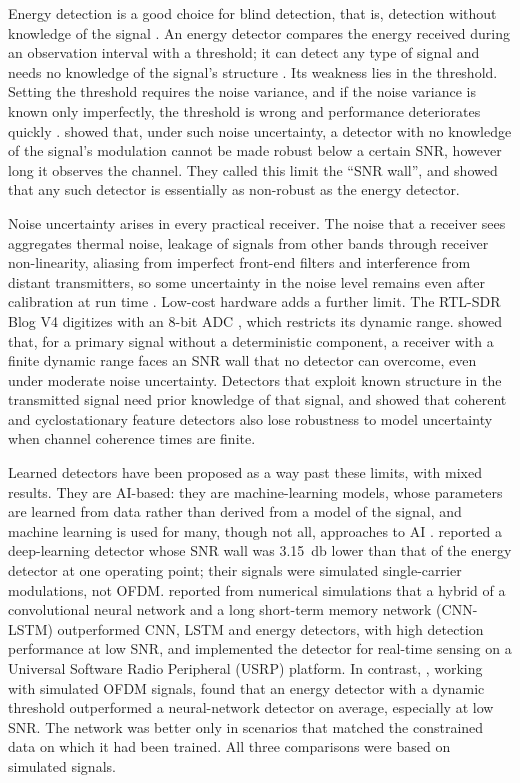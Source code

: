 Energy detection is a good choice for blind detection, that is, detection without knowledge of the signal \parencite{gao2019}. An energy detector compares the energy received during an observation interval with a threshold; it can detect any type of signal and needs no knowledge of the signal's structure \parencite{axell2010}. Its weakness lies in the threshold. Setting the threshold requires the noise variance, and if the noise variance is known only imperfectly, the threshold is wrong and performance deteriorates quickly \parencite{axell2010}. \Textcite{tandra2008} showed that, under such noise uncertainty, a detector with no knowledge of the signal's modulation cannot be made robust below a certain SNR, however long it observes the channel. They called this limit the \enquote{SNR wall}, and showed that any such detector is essentially as non-robust as the energy detector.

Noise uncertainty arises in every practical receiver. The noise that a receiver sees aggregates thermal noise, leakage of signals from other bands through receiver non-linearity, aliasing from imperfect front-end filters and interference from distant transmitters, so some uncertainty in the noise level remains even after calibration at run time \parencite{tandra2008}. Low-cost hardware adds a further limit. The RTL-SDR Blog V4 digitizes with an 8-bit ADC \parencite{rtlsdrblog2024}, which restricts its dynamic range. \Textcite{tandra2005} showed that, for a primary signal without a deterministic component, a receiver with a finite dynamic range faces an SNR wall that no detector can overcome, even under moderate noise uncertainty. Detectors that exploit known structure in the transmitted signal \parencite{axell2010} need prior knowledge of that signal, and \textcite{tandra2008} showed that coherent and cyclostationary feature detectors also lose robustness to model uncertainty when channel coherence times are finite.

Learned detectors have been proposed as a way past these limits, with mixed results. They are AI-based: they are machine-learning models, whose parameters are learned from data rather than derived from a model of the signal, and machine learning is used for many, though not all, approaches to AI \parencite[p.~9]{goodfellow2016}. \Textcite{gao2019} reported a deep-learning detector whose SNR wall was \qty{3.15}{\decibel} lower than that of the energy detector at one operating point; their signals were simulated single-carrier modulations, not OFDM. \Textcite{zeghdoud2023} reported from numerical simulations that a hybrid of a convolutional neural network and a long short-term memory network (CNN-LSTM) outperformed CNN, LSTM and energy detectors, with high detection performance at low SNR, and implemented the detector for real-time sensing on a Universal Software Radio Peripheral (USRP) platform. In contrast, \textcite{grosu2021}, working with simulated OFDM signals, found that an energy detector with a dynamic threshold outperformed a neural-network detector on average, especially at low SNR. The network was better only in scenarios that matched the constrained data on which it had been trained. All three comparisons were based on simulated signals.

